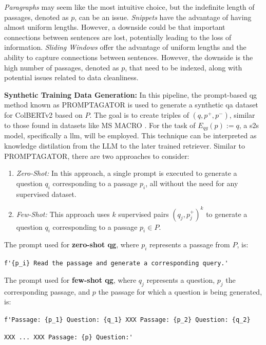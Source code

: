 \textit{Paragraphs} may seem like the most intuitive choice, but the indefinite length of passages, denoted as $p$, can be an issue. \textit{Snippets} have the advantage of having almost uniform lengths. However, a downside could be that important connections between sentences are lost, potentially leading to the loss of information. \textit{Sliding Windows} offer the advantage of uniform lengths and the ability to capture connections between sentences. However, the downside is the high number of passages, denoted as $p$, that need to be indexed, along with potential issues related to data cleanliness.

\noindent\textbf{Synthetic Training Data Generation:} In this pipeline, the prompt-based \gls{qg} method known as PROMPTAGATOR \cite{dai_promptagator_2022} is used to generate a synthetic \gls{qa} dataset for ColBERTv2 \cite{santhanam_colbertv2_2022} based on $P$. The goal is to create triples of $(q, p^{+}, p^{-})$, similar to those found in datasets like MS MACRO \cite{bajaj_ms_2018}. For the task of $E_{qg}(p) := q$, a \gls{s2s} model, specifically a \gls{llm}, will be employed. This technique can be interpreted as knowledge distilation from the LLM to the later trained retriever. Similar to PROMPTAGATOR, there are two approaches to consider:

\begin{enumerate}
    \item \textit{Zero-Shot:} In this approach, a single prompt is executed to generate a question $q_i$ corresponding to a passage $p_i$, all without the need for any supervised dataset.
    
    \item \textit{Few-Shot:} This approach uses $k$ supervised pairs $(q_j, p^{+}_{j})^{k}$ to generate a question $q_i$ corresponding to a passage $p_i \in P$.
\end{enumerate}

The prompt used for \textbf{zero-shot \gls{qg}}, where $p_i$ represents a passage from $P$, is:

\verb|f'{p_i} Read the passage and generate a corresponding query.'|

The prompt used for \textbf{few-shot \gls{qg}}, where $q_j$ represents a question, $p_j$ the corresponding passage, and $p$ the passage for which a question is being generated, is:

\verb|f'Passage: {p_1} Question: {q_1} XXX Passage: {p_2} Question: {q_2}|

\verb|XXX ... XXX Passage: {p} Question:'|

